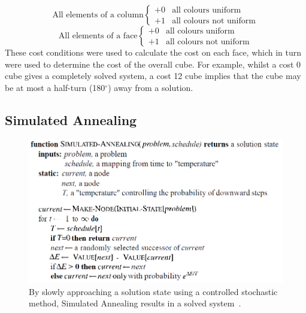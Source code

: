 \documentclass[UKenglish]{svproc}
\begin{document}
\[
   \text{All elements of a column} 
    \begin{cases} 
      +0 & \text{all colours uniform} \\
      +1 & \text{all colours not uniform}
   \end{cases}
\]
\[
   \text{All elements of a face} 
    \begin{cases} 
      +0 & \text{all colours uniform} \\
      +1 & \text{all colours not uniform}
   \end{cases}
\]
These cost conditions were used to calculate the cost on each face, which in turn were used to determine the cost of the overall cube. For example, whilst a cost 0 cube gives a completely solved system, a cost 12 cube implies that the cube may be at most a half-turn (180$^{\circ}$) away from a solution. 

\subsection{Simulated Annealing}

\begin{figure}[!h]
\begin{small}
\centering
\linespread{1.0}
\includegraphics[width=0.75\linewidth]{images/simulated annealing}
\caption{By slowly approaching a solution state using a controlled stochastic method, Simulated Annealing results in a solved system~\cite{10.5555/1671238}.}
\label{fig:fig1}
\end{small}
\end{figure}
\end{document}
